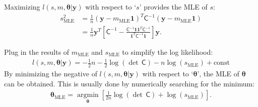 \documentclass[smallextended]{svjour3}       %
\newcommand{\bm}[1]{\boldsymbol{#1}}
\newcommand{\vtheta}{{\bm{\theta}}}
\newcommand{\vc}{\bm{c}}
\newcommand{\vw}{\bm{w}}
\newcommand{\vy}{\bm{y}}
\newcommand{\vone}{\bm{1}}
\newcommand{\mC}{\mathsf{C}}
\newcommand{\mCInv}{{\mathsf{C}^{-1}}}
\newcommand{\hmu}{\hat{\mu}}
\newcommand{\MLE}{\text{MLE}}
\newenvironment{nalign}{
    \begin{equation}
    \begin{aligned}
}{
    \end{aligned}
    \end{equation}
    \ignorespacesafterend
}
\providecommand{\argmin}{\operatorname*{argmin}}
\begin{document}
Maximizing $l(s,m,\vtheta | \vy)$ with respect to `$s$' provides the MLE of $s$:
\begin{align}
\label{eqn_s2_MLE}
\nonumber
s^2_{\MLE}  
&= \frac{1}{n} (\vy-m_{\MLE}\vone)^T\mCInv(\vy-m_{\MLE}\vone) 
\\
&= 
\frac{1}{n}
\vy^T 
\left[ 
\mCInv - 
\frac{ \mCInv \vone \vone^T \mCInv }{\vone^T\mCInv \vone}
\right] \vy.
\end{align}

Plug in the results of $m_\MLE$ and $s_\MLE$ to simplify the log likelihood:
\begin{align*}
l(s,m,\vtheta | \vy) 
= -\frac{1}{2} n - \frac{1}{2} \log(\det\,\mC) - n \log(s_\MLE) + \text{const}
\end{align*}
By minimizing the negative of $l(s,m,\vtheta | \vy) $ with respect to `$\vtheta$', the MLE of $\vtheta$ can be obtained. This is usually done by numerically searching for the minimum:
\begin{nalign}
\label{eqn_MLE_loss_function}
\vtheta_\MLE
= 
\argmin_{\vtheta}
\left[
 \frac{1}{2n} \log(\det\, \mC) + 
 \log\left(s_\MLE \right) 
\right].
\end{nalign}

\end{document}
